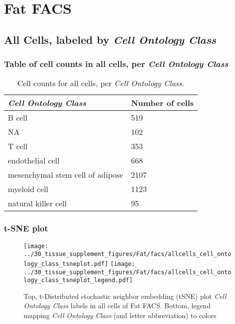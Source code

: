 \clearpage
\section{Fat FACS}

\subsection{All Cells, labeled by \emph{Cell Ontology Class}}
\subsubsection{Table of cell counts in all cells, per \emph{Cell Ontology Class}}\begin{table}[h]
\centering
\label{my-label}
\begin{tabular}{@{}ll@{}}
\toprule

\emph{Cell Ontology Class}& Number of cells \\ \midrule
B cell & 519 \\

NA & 102 \\

T cell & 353 \\

endothelial cell & 668 \\

mesenchymal stem cell of adipose & 2107 \\

myeloid cell & 1123 \\

natural killer cell & 95 \\
\bottomrule
\end{tabular}
\caption{Cell counts for all cells, per \emph{Cell Ontology Class}.}
\end{table}

\clearpage
\subsubsection{t-SNE plot}
\begin{figure}[h]
\centering
\texttt{[image: ../30\_tissue\_supplement\_figures/Fat/facs/allcells\_cell\_ontology\_class\_tsneplot.pdf]}
\texttt{[image: ../30\_tissue\_supplement\_figures/Fat/facs/allcells\_cell\_ontology\_class\_tsneplot\_legend.pdf]}
\caption{Top, t-Distributed stochastic neighbor embedding (tSNE) plot  \emph{Cell Ontology Class} labels in all cells of Fat FACS. Bottom, legend mapping \emph{Cell Ontology Class} (and letter abbreviation) to colors}
\end{figure}


